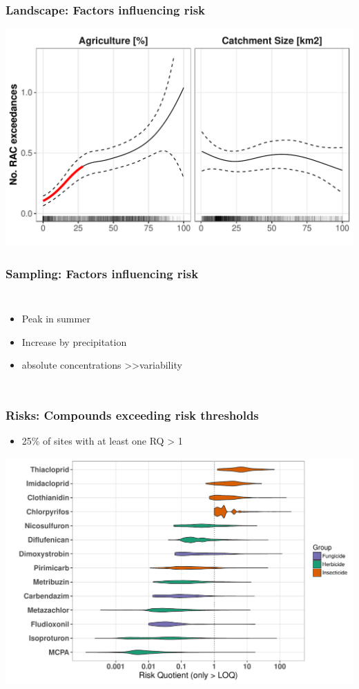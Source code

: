 \documentclass[
	12pt
	]{beamer}
\begin{document}
\begin{frame}
\frametitle{Landscape: Factors influencing risk}
	\includegraphics[width = 1\textwidth]{figs/agri_size_eff.pdf}
\end{frame}

\begin{frame}
\frametitle{Sampling: Factors influencing risk}
	\begin{columns}
			\resizebox{1.2\textwidth}{!}{%
				\begingroup
				\footnotesize %
					\hspace*{-10mm}
				\endgroup
				}

	    	\begin{itemize}
	    		\item Peak in summer
	    		\item Increase by \alert{precipitation}
	    		\item absolute concentrations \textgreater\textgreater variability
	    	\end{itemize}
	\end{columns}
\end{frame}



\begin{frame}
\frametitle{Risks: Compounds exceeding risk thresholds}
    \begin{itemize}
		\item 25\% of sites with at least one RQ > 1
	\end{itemize}
	\includegraphics[width = 1\textwidth]{figs/compounds.pdf}
\end{frame}
\end{document}

